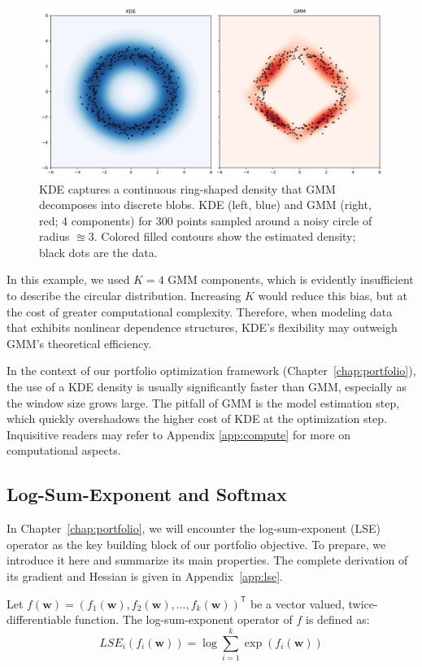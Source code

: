 \begin{figure}[H]
  \centering
  \includegraphics[width=\textwidth]{images/20_3.png}
  \caption[Best case scenario - KDE]{KDE captures a continuous ring-shaped density that GMM decomposes into discrete blobs. KDE (left, blue) and GMM (right, red; 4 components) for 300 points sampled around a noisy circle of radius $\approxeq$3. Colored filled contours show the estimated density; black dots are the data. }
  \label{fig:10_4}
\end{figure}

In this example, we used $K=4$ GMM components, which is evidently insufficient to describe the circular distribution. Increasing $K$ would reduce this bias, but at the cost of greater computational complexity. Therefore, when modeling data that exhibits nonlinear dependence structures, KDE's flexibility may outweigh GMM's theoretical efficiency.

In the context of our portfolio optimization framework (Chapter~\ref{chap:portfolio}), the use of a KDE density is usually significantly faster than GMM, especially as the window size grows large. The pitfall of GMM is the model estimation step, which quickly overshadows the higher cost of KDE at the optimization step. Inquisitive readers may refer to Appendix \ref{app:compute} for more on computational aspects.

\subsection{Log-Sum-Exponent and Softmax}
In Chapter~\ref{chap:portfolio}, we will encounter the log-sum-exponent (LSE) operator as the key building block of our portfolio objective. To prepare, we introduce it here and summarize its main properties. The complete derivation of its gradient and Hessian is given in Appendix~\ref{app:lse}.

Let $f(\mathbf{w})=(f_1(\mathbf{w}), f_2(\mathbf{w}),...,f_k(\mathbf{w}))^{\mathsf{T}}$ be a vector valued, twice-differentiable function. The log-sum-exponent operator of $f$ is defined as:
$$LSE_i(f_i(\mathbf{w}))=\log{\sum_{i=1}^{k}\exp(f_i(\mathbf{w}))}$$

